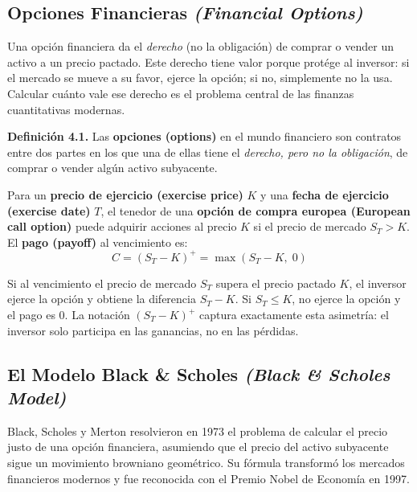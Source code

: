\documentclass[12pt]{article}
\begin{document}
\subsection{Opciones Financieras \textit{(Financial Options)}}

\begin{intuicion}
Una opci\'on financiera da el \textit{derecho} (no la obligaci\'on) de comprar o vender un activo a un precio pactado. Este derecho tiene valor porque prot\'ege al inversor: si el mercado se mueve a su favor, ejerce la opci\'on; si no, simplemente no la usa. Calcular cu\'anto vale ese derecho es el problema central de las finanzas cuantitativas modernas.
\end{intuicion}

\textbf{Definici\'on 4.1.} Las \textbf{opciones (options)} en el mundo financiero son contratos entre dos partes en los que una de ellas tiene el \textit{derecho, pero no la obligaci\'on}, de comprar o vender alg\'un activo subyacente.

Para un \textbf{precio de ejercicio (exercise price)} $K$ y una \textbf{fecha de ejercicio (exercise date)} $T$, el tenedor de una \textbf{opci\'on de compra europea (European call option)} puede adquirir acciones al precio $K$ si el precio de mercado $S_T > K$. El \textbf{pago (payoff)} al vencimiento es:
\begin{equation}
  C = (S_T - K)^{+} = \max(S_T - K,\; 0)
\end{equation}

\begin{intuicionmat}
Si al vencimiento el precio de mercado $S_T$ supera el precio pactado $K$, el inversor ejerce la opci\'on y obtiene la diferencia $S_T - K$. Si $S_T \leq K$, no ejerce la opci\'on y el pago es 0. La notaci\'on $(S_T - K)^+$ captura exactamente esta asimetr\'ia: el inversor solo participa en las ganancias, no en las p\'erdidas.
\end{intuicionmat}

\subsection{El Modelo Black \& Scholes \textit{(Black \& Scholes Model)}}

\begin{intuicion}
Black, Scholes y Merton resolvieron en 1973 el problema de calcular el precio justo de una opci\'on financiera, asumiendo que el precio del activo subyacente sigue un movimiento browniano geom\'etrico. Su f\'ormula transform\'o los mercados financieros modernos y fue reconocida con el Premio Nobel de Econom\'ia en 1997.
\end{intuicion}
\end{document}
